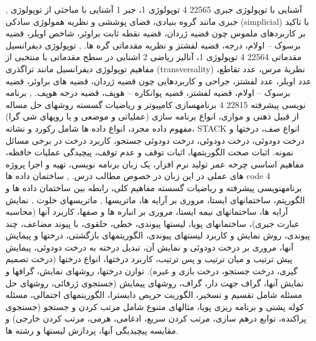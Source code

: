 \documentclass[class=article, crop=false]{standalone}
\begin{document}
{{{{        }}
        },{{
            آشنایی با توپولوژی جبری
        }{
            22565
        }{
            4
        }{
            توپولوژی 1، جبر 1
        }{}{{
            آشنایی با مباحثی از توپولوژی جبری مانند گروه بنیادی، فضای پوششی و نظریه همولوژی سادکی (simplicial) با تاکید بر کاربردهای ملموس چون قضیه ژردان، قضیه نقطه ثابت براوئر، شاخص اویلر، قضیه برسوک – اولام، درجه، قضیه لفشتز و نظریه مقدماتی گره ها.
        }}
        },{{
            توپولوژی دیفرانسیل مقدماتی
        }{
            22564
        }{
            4
        }{
            توپولوژی 1، آنالیز ریاضی 2
        }{}{{
            اشنایی در سطح مقدماتی با منتخبی از مفاهیم توپولوژی دیفرانسیل مانند تراگذری (transversality) نظریۀ مرس، عدد تقاطع، عدد اویلر، عدد لفشتز، جراحی و کاربردهایی چون قضیه ژردان، قضیه های براوئر، قضیه برسوک – اولام، قضیه لفشتز، قضیه پوانکاره – هوپف، قضیه درجه هوپف.
        }}
        },{{
            برنامه نویسی پیشرفته
        }{
            22815
        }{
            4
        }{
            برنامهسازی کامپیوتر و ریاضیات گسسته
        }{}{{
            روشهای حل مساله از قبیل ذهنی و موازی، انواع برنامه سازی (عملیاتی و موضعی و یا رویهای شی گرا) مفهوم داده مجرد، انواع داده ها شامل رکورد و نشانه، STACK انواع صف، درختها و درخت دودوئی، درخت دودوئی، درخت دودوئی جستجو، کاربرد درخت در برخی مسائل نمونه. اثبات صحت الگوریتمها، اثبات توقف و عدم توقف، پیچیدگی عملیات حافظه، مفاهیم اساسی چرخه عمر تولید نرم افزار، یک زبان برنامه نویسی، تهیه و اجرا پروژه های عملی در این زبان در خصوص مطالب درس.
        }}
        },{{
            ساختمان داده ها
        }{
            code
        }{
            4
        }{
            برنامهنویسی پیشرفته و ریاضیات گسسته
        }{}{{
            مفاهیم کلی، رابطه بین ساختمان داده ها و الگوریتم، ساختمانهای ایستا، مروری بر آرایه ها، ماتریسها ‚ ماتریسهای خلوت ‚ نمایش آرایه ها، ساختمانهای نیمه ایستا، مروری بر انباره ها و صفها، کاربرد آنها (محاسبه عبارت جبری)، ساختمانهای پویا، لیستها پیوندی، خطی، حلقوی، با پیوند مضاعف، چند پیوندی، روش نمایش و کاربرد لیستهای پیوندی، الگوریتمهای بازگشتی، درختها و پیمایش آنها، مروری بر درخت دودوئی و نمایش آن، تبدیل درخته به درخت دودوئی، پیمایش پیش ترتیب و میان ترتیب و پس ترتیب، کاربرد درختها، انواع درختها (درخت تصمیم گیری، درخت جستجو، درخت بازی و غیره). توازن درختها، روشهای نمایش، گرافها و نمایش آنها، گراف جهت دار، گراف، روشهای پیمایش (جستجوی ژرفائی، روشهای حل مسئله شامل تقسیم و تسخیر، الگوریت حریص دایسترا، الگوریتمهای احتمالی، مسئله کوله پشتی و برنامه ریزی پویا، مثالهای متنوع شامل مرتب کردن و جستجو (جستجوی پراکنده، توابع درهم سازی، مرتب کردن سریع، ادغامی، هرمی، مرتب کردن خارجی) و مقایسه پیچیدیگی آنها، پردازش لیستها و رشته ها.
}}}}
\end{document}
